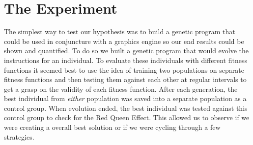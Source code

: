 \documentclass{acm_proc_article-sp}
\begin{document}
\section{The Experiment} %

The simplest way to test our hypothesis was to build a genetic program that could be used in conjuncture with a graphics engine so our end results could be shown and quantified. To do so we built a genetic program that would evolve the instructions for an individual. To evaluate these individuals with different fitness functions it seemed best to use the idea of training two populations on separate fitness functions and then testing them against each other at regular intervals to get a grasp on the validity of each fitness function. After each generation, the best individual from \textit{either} population was saved into a separate population as a control group. When evolution ended, the best individual was tested against this control group to check for the Red Queen Effect. This allowed us to observe if we were creating a overall best solution or if we were cycling through a few strategies.
\end{document}

